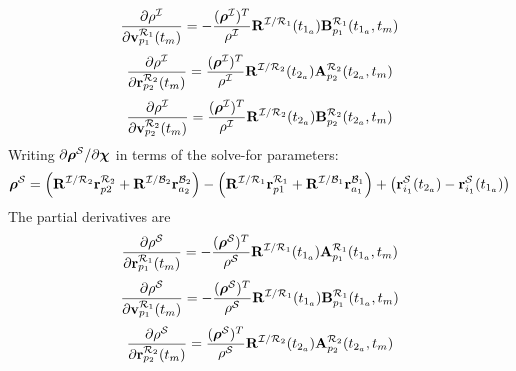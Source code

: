 %
\begin{equation}
   \frac{\partial \rho^\mcI}{\partial \mathbf{v}^{\mcR_1}_{p_{1}}(t_m)} = - \frac{(\boldsymbol{\rho}^\mcI)^T}{\rho^\mcI}\mathbf{R}^{\mathcal{I}/\mathcal{R}_1}(t_{1_a})\mathbf{B}_{p_1}^{\mcR_1}(t_{1_a},t_m)
\end{equation}
%
\begin{equation}
   \frac{\partial \rho^\mcI}{\partial \mathbf{r}^{\mcR_2}_{p_{2}}(t_m)} =  \frac{(\boldsymbol{\rho}^\mcI)^T}{\rho^\mcI}\mathbf{R}^{\mathcal{I}/\mathcal{R}_2}(t_{2_a})\mathbf{A}_{p_2}^{\mcR_2}(t_{2_a},t_m)
\end{equation}
%
\begin{equation}
   \frac{\partial \rho^\mcI}{\partial \mathbf{v}^{\mcR_2}_{p_{2}}(t_m)} =  \frac{(\boldsymbol{\rho}^\mcI)^T}{\rho^\mcI}\mathbf{R}^{\mathcal{I}/\mathcal{R}_2}(t_{2_a})\mathbf{B}_{p_2}^{\mcR_2}(t_{2_a},t_m)
   \label{Eq:InertialDistancePartial4}
\end{equation}
%
Writing  $\partial \boldsymbol{\rho}^\mcS/\partial \boldsymbol{\chi}$ in terms of the solve-for parameters:
\begin{equation}
    \boldsymbol{\rho}^\mcS = \left(\mathbf{R}^{\mathcal{I}/\mathcal{R}_2}\mathbf{r}_{p2}^{\mathcal{R}_2} + \mathbf{R}^{\mathcal{I}/\mathcal{B}_2}\mathbf{r}_{a_{2}}^{\mathcal{B}_2} \right)  - \left( \mathbf{R}^{\mathcal{I}/\mathcal{R}_1}\mathbf{r}_{p1}^{\mathcal{R}_1} + \mathbf{R}^{\mathcal{I}/\mathcal{B}_1}\mathbf{r}_{a_{1}}^{\mathcal{B}_1}\right) + \left( \mathbf{r}_{i_1}^{\mathcal{S}}(t_{2_a}) - \mathbf{r}_{i_1}^{\mathcal{S}} (t_{1_a})\right)
\end{equation}
%
The partial derivatives are
%
\begin{equation}
   \frac{\partial \rho^\mcS}{\partial \mathbf{r}^{\mcR_1}_{p_{1}}(t_m)} = - \frac{(\boldsymbol{\rho}^\mcS)^T}{\rho^\mcS}\mathbf{R}^{\mathcal{I}/\mathcal{R}_1}(t_{1_a})\mathbf{A}_{p_1}^{\mcR_1}(t_{1_a},t_m)
   \label{Eq:BarycentricDistancePartial1}
\end{equation}
%
\begin{equation}
   \frac{\partial \rho^\mcS}{\partial \mathbf{v}^{\mcR_1}_{p_{1}}(t_m)} =  - \frac{(\boldsymbol{\rho}^\mcS)^T}{\rho^\mcS}\mathbf{R}^{\mathcal{I}/\mathcal{R}_1}(t_{1_a})\mathbf{B}_{p_1}^{\mcR_1}(t_{1_a},t_m)
\end{equation}
%
\begin{equation}
   \frac{\partial \rho^\mcS}{\partial \mathbf{r}^{\mcR_2}_{p_{2}}(t_m)} = \frac{(\boldsymbol{\rho}^\mcS)^T}{\rho^\mcS}\mathbf{R}^{\mathcal{I}/\mathcal{R}_2}(t_{2_a})\mathbf{A}_{p_2}^{\mcR_2}(t_{2_a},t_m)
\end{equation}
